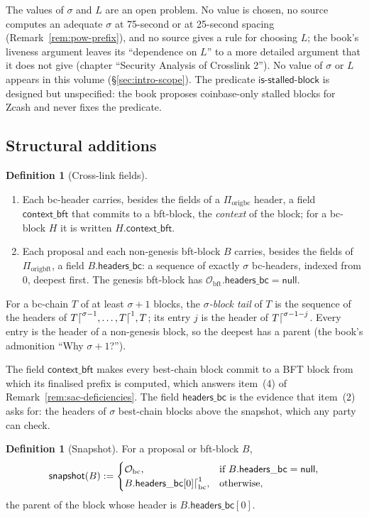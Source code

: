 \documentclass[11pt,a4paper]{article}
\theoremstyle{definition}
\newtheorem{definition}[theorem]{Definition}
\newcommand{\bc}{\mathrm{bc}}
\newcommand{\bft}{\mathrm{bft}}
\newcommand{\Origin}{\mathcal{O}}
\newcommand{\Obc}{\Origin_{\bc}}
\newcommand{\Obft}{\Origin_{\bft}}
\newcommand{\Piorigbc}{\Pi_{\mathrm{origbc}}}
\newcommand{\Piorigbft}{\Pi_{\mathrm{origbft}}}
\newcommand{\isstalledblock}{\mathsf{is\text{-}stalled\text{-}block}}
\newcommand{\contextbft}{\mathsf{context\_bft}}
\newcommand{\headersbc}{\mathsf{headers\_bc}}
\newcommand{\snapshot}{\mathsf{snapshot}}
\begin{document}
The values of $\sigma$ and $L$ are an open problem. No value is chosen, no
source computes an adequate $\sigma$ at 75-second or at 25-second spacing
(Remark~\ref{rem:pow-prefix}), and no source gives a rule for choosing $L$;
the book's liveness argument leaves its ``dependence on $L$'' to a more
detailed argument that it does not give (chapter ``Security Analysis of
Crosslink 2''). No value of $\sigma$ or $L$ appears in this volume
(\S\ref{sec:intro-scope}). The predicate $\isstalledblock$ is designed but
unspecified: the book proposes coinbase-only stalled blocks for Zcash and
never fixes the predicate.

\subsection{Structural additions}\label{sec:cons-struct}

\begin{definition}[Cross-link fields]\label{def:fields}
\begin{enumerate}[label=(\roman*)]
\item Each bc-header carries, besides the fields of a $\Piorigbc$ header, a
  field $\contextbft$ that commits to a bft-block, the \emph{context} of the
  block; for a bc-block $H$ it is written $H.\contextbft$.
\item Each proposal and each non-genesis bft-block $B$ carries, besides the
  fields of $\Piorigbft$, a field $B.\headersbc$: a sequence of exactly
  $\sigma$ bc-headers, indexed from $0$, deepest first. The genesis
  bft-block has $\Obft.\headersbc = \mathsf{null}$.
\end{enumerate}
For a bc-chain $T$ of at least $\sigma + 1$ blocks, the \emph{$\sigma$-block
tail} of $T$ is the sequence of the headers of $T\trunc{\sigma - 1}, \dots,
T\trunc{1}, T$; its entry $j$ is the header of $T\trunc{\sigma - 1 - j}$. Every
entry is the header of a non-genesis block, so the deepest has a parent (the
book's admonition ``Why $\sigma + 1$?'').
\end{definition}

The field $\contextbft$ makes every best-chain block commit to a BFT block
from which its finalised prefix is computed, which answers item~(4) of
Remark~\ref{rem:sac-deficiencies}. The field $\headersbc$ is the evidence that
item~(2) asks for: the headers of $\sigma$ best-chain blocks above the
snapshot, which any party can check.

\begin{definition}[Snapshot]\label{def:snapshot}
For a proposal or bft-block $B$,
\[
  \snapshot(B) :=
  \begin{cases}
    \Obc, & \text{if } B.\headersbc = \mathsf{null},\\
    B.\headersbc[0]\trunc[\bc]{1}, & \text{otherwise},
  \end{cases}
\]
the parent of the block whose header is $B.\headersbc[0]$.
\end{definition}
\end{document}
